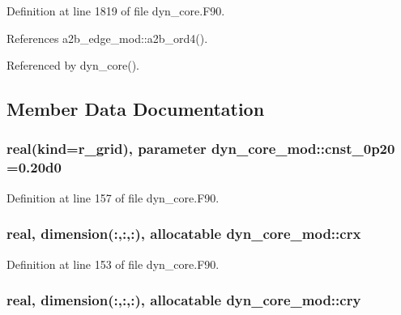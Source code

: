 Definition at line 1819 of file dyn\-\_\-core.\-F90.



References a2b\-\_\-edge\-\_\-mod\-::a2b\-\_\-ord4().



Referenced by dyn\-\_\-core().



\subsection{Member Data Documentation}
\subsubsection[{cnst\-\_\-0p20}]{\setlength{\rightskip}{0pt plus 5cm}real(kind=r\-\_\-grid), parameter dyn\-\_\-core\-\_\-mod\-::cnst\-\_\-0p20 =0.\-20d0\hspace{0.3cm}{\ttfamily [private]}}\label{classdyn__core__mod_af0b6436fcf85fefea9c1020f2f5f7244}


Definition at line 157 of file dyn\-\_\-core.\-F90.

\subsubsection[{crx}]{\setlength{\rightskip}{0pt plus 5cm}real, dimension(\-:,\-:,\-:), allocatable dyn\-\_\-core\-\_\-mod\-::crx\hspace{0.3cm}{\ttfamily [private]}}\label{classdyn__core__mod_adc731c91709904f8c6939a47285ec0ce}


Definition at line 153 of file dyn\-\_\-core.\-F90.

\subsubsection[{cry}]{\setlength{\rightskip}{0pt plus 5cm}real, dimension(\-:,\-:,\-:), allocatable dyn\-\_\-core\-\_\-mod\-::cry\hspace{0.3cm}{\ttfamily [private]}}\label{classdyn__core__mod_ab16557a82a1a0be81d478b8c69606d8c}


